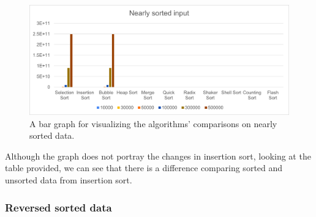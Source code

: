 \documentclass{article}
\begin{document}
\begin{figure}[H]
\includegraphics[scale = 0.8]{NSortedBar.png}
\caption{A bar graph for visualizing the algorithms’ comparisons on nearly sorted data.}
\centering
\end{figure}

Although the graph does not portray the changes in insertion sort, looking at the table provided, we can see that there is a difference comparing sorted and unsorted data from insertion sort.

\subsubsection{Reversed sorted data}
\end{document}
